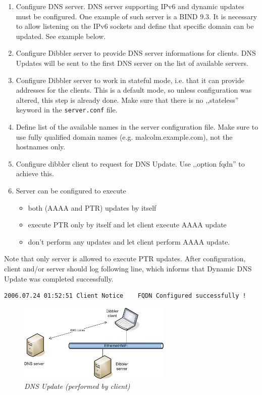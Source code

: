 \begin{enumerate}
\item Configure DNS server. DNS server supporting IPv6 and dynamic
  updates must be configured. One example of such server is a BIND
  9.3. It is necessary to allow listening on the IPv6 sockets and
  define that specific domain can be updated. See example below.
\item Configure Dibbler server to provide DNS server informations for
  clients. DNS Updates will be sent to the first DNS server on the
  list of available servers.
\item Configure Dibbler server to work in stateful mode, i.e. that it
  can provide addresses for the clients. This is a default mode, so
  unless configuration was altered, this step is already done. Make
  sure that there is no ,,stateless'' keyword in the
  \verb+server.conf+ file.
\item Define list of the available names in the server configuration
  file. Make sure to use fully qualified domain names
  (e.g. malcolm.example.com), not the hostnames only. 
\item Configure dibbler client to request for DNS Update. Use ,,option
  fqdn'' to achieve this. 
\item Server can be configured to execute 
      \begin{itemize}
       \item both (AAAA and PTR) updates by itself
       \item execute PTR only by itself and let client execute AAAA
	     update
       \item don't perform any updates and let client perform AAAA
	     update.
      \end{itemize}
\end{enumerate}

Note that only server is allowed to execute PTR updates. After
configuration, client and/or server should log following line, which
informs that Dynamic DNS Update was completed successfully.

\begin{verbatim}
2006.07.24 01:52:51 Client Notice    FQDN Configured successfully !
\end{verbatim}

\begin{figure}[ht]
\begin{center}
\includegraphics[width=0.65\textwidth]{dibbler-fqdn-cli-update}
\caption{\emph{DNS Update (performed by client)}}
\end{center}
\end{figure}

